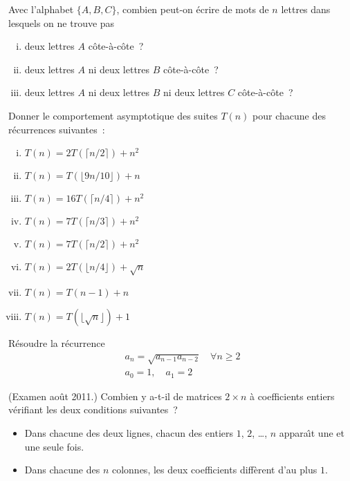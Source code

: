 \begin{exo}
Avec l'alphabet $\{A,B,C\}$, combien peut-on \'ecrire de mots de $n$ lettres dans lesquels on ne trouve pas
%
\begin{enumerate}[(i)]
\item deux lettres $A$ c\^ote-\`a-c\^ote~?
\item deux lettres $A$ ni deux lettres $B$ c\^ote-\`a-c\^ote~?
\item deux lettres $A$ ni deux lettres $B$ ni deux lettres $C$ c\^ote-\`a-c\^ote~?
\end{enumerate}
\end{exo}

\begin{exo}
Donner le comportement asymptotique des suites $T(n)$ pour chacune des r\'ecurrences suivantes~:
%
\begin{enumerate}[(i)]
\item $T(n) = 2T(\lceil n/2 \rceil) + n^2$
\item $T(n) = T(\lfloor 9n/10 \rfloor) + n$
\item $T(n) = 16T(\lceil n/4 \rceil) + n^2$
\item $T(n) = 7 T(\lceil n/3 \rceil) + n^2$
\item $T(n) = 7 T(\lceil n/2 \rceil) + n^2$
\item $T(n) = 2 T(\lfloor n/4 \rfloor) + \sqrt{n}$
\item $T(n) = T(n-1) + n$
\item $T(n) = T(\lfloor \sqrt{n} \rfloor) + 1$
\end{enumerate}
\end{exo}

\begin{exo}
R\'esoudre la r\'ecurrence
$$
\begin{array}{l}
a_n = \sqrt{a_{n-1} a_{n-2}} \quad \forall n \geqslant 2\\
a_0 = 1, \quad a_1 = 2
\end{array}
$$
\end{exo}

\begin{exo} (Examen ao\^ut 2011.)
Combien y a-t-il de matrices $2 \times n$ \`a coefficients entiers v\'erifiant les deux conditions suivantes~?
%
\begin{itemize}
\item Dans chacune des deux lignes, chacun des entiers $1$, $2$, \ldots, $n$ appara\^\i{}t une et une seule fois.
\item Dans chacune des $n$ colonnes, les deux coefficients diff\`erent d'au plus $1$.
\end{itemize}
\end{exo}

